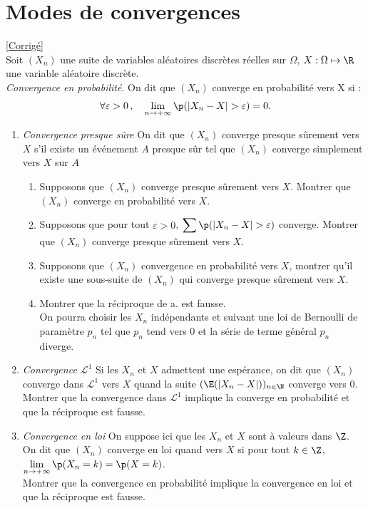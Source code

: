 \documentclass[8pt]{book}
\begin{document}
\section{Modes de convergences }
\label{Modes de convergences}
\textcolor{blue}{\hyperref[Modes de convergences corrigé]{[Corrigé]}}\\
Soit $(X_n)$ une suite de variables aléatoires discrètes réelles sur $\Omega$, $X:\Omega\mapsto \R$ une variable aléatoire discrète.\\
\textit{Convergence en probabilité}. On dit que $(X_n)$ converge en probabilité vers X si : $$\forall \varepsilon>0 \,, \quad \displaystyle\lim_{n\to+\infty} \p(|X_n-X|>\varepsilon)=0.$$
\begin{enumerate}
	\item \textit{Convergence presque sûre} On dit que $(X_n)$ converge presque sûrement vers $X$ s'il existe un événement $A$ presque sûr tel que $(X_n)$ converge simplement vers $X$ sur $A$
	\begin{enumerate}[label=\alph*.]
		\item Supposons que $(X_n)$ converge presque sûrement vers $X$. Montrer que $(X_n)$ converge en probabilité vers $X$.
		\item Supposons que pour tout $\varepsilon>0$, $\displaystyle\sum\p(|X_n-X|>\varepsilon)$ converge. Montrer que $(X_n)$ converge presque sûrement vers $X$.
		\item Supposons que $(X_n)$ convergence en probabilité vers $X$, montrer qu'il existe une sous-suite de $(X_n)$ qui converge presque sûrement vers $X$. 
		\item Montrer que la réciproque de a. est fausse. 
		\\On pourra choisir les $X_n$ indépendants et suivant une loi de Bernoulli de paramètre $p_n$ tel que $p_n$ tend vers 0 et la série de terme général $p_n$ diverge.
	\end{enumerate}
	\item \textit{Convergence $\mathcal{L}^1$} Si les $X_n$ et $X$ admettent une espérance, on dit que $(X_n)$ converge dans $\mathcal{L}^1$ vers $X$ quand la suite $(\E(|X_n-X|))_{n\in\N}$ converge vers 0.
	\\Montrer que la convergence dans $\mathcal{L}^1$ implique la converge en probabilité et que la réciproque est fausse.
	\item \textit{Convergence en loi} On suppose ici que les $X_n$ et $X$ sont à valeurs dans $\Z$. On dit que $(X_n)$ converge en loi quand vers $X$  si pour tout $k\in\Z$, $\displaystyle\lim_{n\to+\infty}\p(X_n=k)=\p(X=k)$.
	\\ Montrer que la convergence en probabilité implique la convergence en loi et que la réciproque est fausse.
\end{enumerate}
\end{document}
